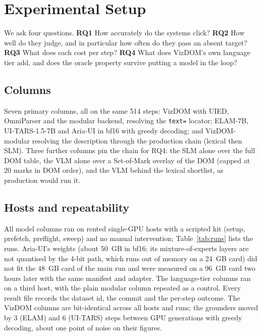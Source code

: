 \documentclass[conference]{IEEEtran}
\newcommand{\code}[1]{\texttt{#1}}
\begin{document}
\section{Experimental Setup}
\label{sec:setup}
We ask four questions. \textbf{RQ1} How accurately do the systems click? \textbf{RQ2} How well do they judge, and in particular how often do they pass an absent target? \textbf{RQ3} What does each cost per step? \textbf{RQ4} What does VizDOM's own language tier add, and does the oracle property survive putting a model in the loop?

\subsection{Columns}
Seven primary columns, all on the same 514 steps: VizDOM with UIED, OmniParser and the modular backend, resolving the \code{text=} locator; ELAM-7B, UI-TARS-1.5-7B and Aria-UI in bf16 with greedy decoding; and VizDOM-modular resolving the description through the production chain (lexical then SLM). Three further columns pin the chain for RQ4: the SLM alone over the full DOM table, the VLM alone over a Set-of-Mark overlay of the DOM (capped at 20 marks in DOM order), and the VLM behind the lexical shortlist, as production would run it.

\subsection{Hosts and repeatability}
All model columns ran on rented single-GPU hosts with a scripted kit (setup, prefetch, preflight, sweep) and no manual intervention; Table~\ref{tab:runs} lists the runs. Aria-UI's weights (about 50~GB in bf16; its mixture-of-experts layers are not quantised by the 4-bit path, which runs out of memory on a 24~GB card) did not fit the 48~GB card of the main run and were measured on a 96~GB card two hours later with the same manifest and adapter. The language-tier columns ran on a third host, with the plain modular column repeated as a control. Every result file records the dataset id, the commit and the per-step outcome. The VizDOM columns are bit-identical across all hosts and runs; the grounders moved by 3 (ELAM) and 6 (UI-TARS) steps between GPU generations with greedy decoding, about one point of noise on their figures.
\end{document}
